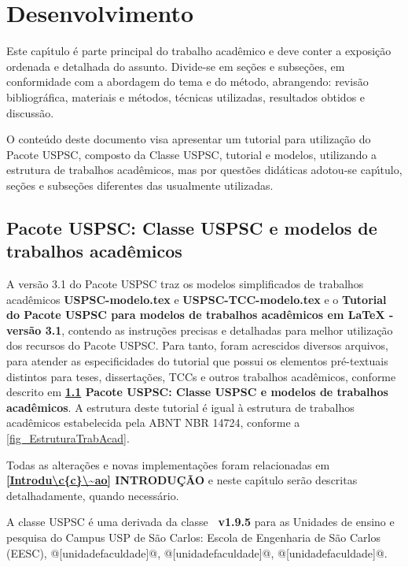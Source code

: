

\chapter{Desenvolvimento}\label{cap_exemplos}
Este cap\'{\i}tulo \'e parte principal do trabalho acad\^emico e deve conter a exposi\c{c}\~ao ordenada e detalhada do assunto. Divide-se em se\c{c}\~oes e subse\c{c}\~oes, em conformidade com a abordagem do tema e do m\'etodo, abrangendo: revis\~ao bibliogr\'afica, materiais e m\'etodos, t\'ecnicas utilizadas, resultados obtidos e discuss\~ao.

O conte\'udo deste documento visa apresentar um tutorial para utiliza\c{c}\~ao do Pacote USPSC, composto da Classe USPSC, tutorial e modelos, utilizando a estrutura de trabalhos acad\^emicos, mas por quest\~oes did\'aticas adotou-se cap\'{\i}tulo, se\c{c}\~oes e subse\c{c}\~oes diferentes das usualmente utilizadas.


\section{Pacote USPSC: Classe USPSC e modelos de trabalhos acad\^emicos}\label{Pacote}
A vers\~ao 3.1 do Pacote USPSC traz os modelos simplificados de trabalhos acad\^emicos \textbf{USPSC-modelo.tex} e \textbf{USPSC-TCC-modelo.tex} e o \textbf{Tutorial do Pacote USPSC para modelos de trabalhos acad\^emicos em LaTeX - vers\~ao 3.1}, contendo as instru\c{c}\~oes precisas e detalhadas para melhor utiliza\c{c}\~ao dos recursos do Pacote USPSC. Para tanto, foram acrescidos diversos arquivos, para atender as especificidades do tutorial que possui os elementos pr\'e-textuais distintos para teses, disserta\c{c}\~oes, TCCs e outros trabalhos acad\^emicos, conforme descrito em  \textbf{\ref{Pacote} Pacote USPSC: Classe USPSC e modelos de trabalhos acad\^emicos}. A estrutura deste tutorial \'e igual \`a estrutura de trabalhos acad\^emicos estabelecida pela ABNT NBR 14724, conforme a \autoref{fig_EstruturaTrabAcad}.

Todas as altera\c{c}\~oes e novas implementa\c{c}\~oes foram relacionadas em \textbf{\ref{Introdu\c{c}\~ao} INTRODU\c{C}\~AO} e neste cap\'{\i}tulo ser\~ao descritas detalhadamente, quando necess\'ario. 

A classe USPSC \'e uma derivada da classe \textbf{\abnTeX\ v1.9.5} para as Unidades de ensino e pesquisa do Campus USP de S\~ao Carlos:
Escola de Engenharia de S\~ao Carlos (EESC), @[unidadefaculdade]@, @[unidadefaculdade]@, @[unidadefaculdade]@.

